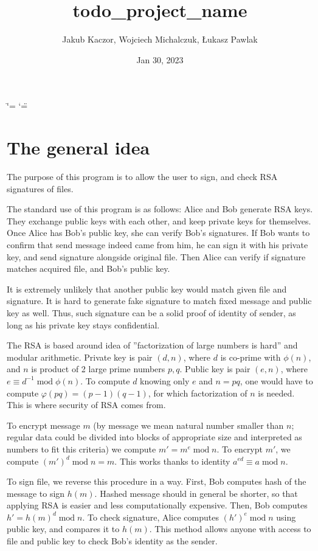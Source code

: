\documentclass[letterpaper,10pt,english]{sphinxmanual}
\title{todo\_project\_name}
\date{Jan 30, 2023}
\author{Jakub Kaczor, Wojciech Michalczuk, Łukasz Pawlak}
\begin{document}
\ifdefined\shorthandoff
  \ifnum\catcode`\=\string=\active\shorthandoff{=}\fi
  \ifnum\catcode`\"=\active{}\fi
\fi

\pagestyle{empty}
\sphinxmaketitle
\pagestyle{plain}
\sphinxtableofcontents
\pagestyle{normal}
\label{\detokenize{index::doc}}


\sphinxstepscope


\chapter{The general idea}
The purpose of this program is to allow the user to sign, and check RSA
signatures of files.

The standard use of this program is as follows:
Alice and Bob generate RSA keys. They exchange public keys with each other,
and keep private keys for themselves. Once Alice has Bob's public key, she
can verify Bob's signatures. If Bob wants to confirm that send message
indeed came from him, he can sign it with his private key, and send
signature alongside original file. Then Alice can verify if signature
matches acquired file, and Bob's public key.

It is extremely unlikely that another public key would match given
file and signature. It is hard to generate fake signature to
match fixed message and public key as well.
Thus, such signature can be a solid proof of identity
of sender, as long as his private key stays confidential.

The RSA is based around idea of ''factorization of large numbers is hard''
and modular arithmetic. Private key is pair $(d, n)$, where $d$ is
co-prime with $\phi(n)$, and $n$ is product of 2 large prime numbers $p, q$.
Public key is pair $(e, n)$, where $e \equiv d^{-1} \operatorname{mod} \phi(n)$.
To compute $d$ knowing only $e$ and $n = pq$, one would have to
compute $\varphi(pq) = (p - 1)(q - 1)$, for which factorization of $n$ is needed.
This is where security of RSA comes from.

To encrypt message $m$ (by message we mean natural number smaller than $n$;
regular data could be divided into blocks of appropriate size and interpreted
as numbers to fit this criteria) we compute $m' = m^{e}\operatorname{mod} n$.
To encrypt $m'$, we compute $(m')^{d}\operatorname{mod} n = m$. This works
thanks to identity $a^{ed}\equiv a \operatorname{mod} n$.

To sign file, we reverse this procedure in a way. First, Bob computes
hash of the message to sign $h(m)$. Hashed message should in general
be shorter, so that applying RSA is easier and less computationally expensive.
Then, Bob computes $h' = h(m)^d \operatorname{mod} n$.
To check signature, Alice computes $(h')^{e}\operatorname{mod}n$ using public key,
and compares it to $h(m)$.
This method allows anyone with access to file and public key to check Bob's
identity as the sender.
\end{document}
